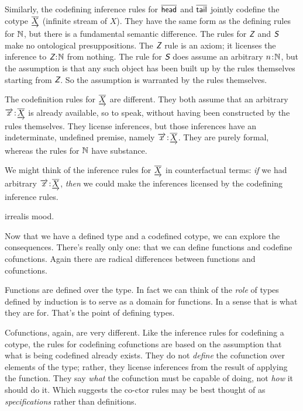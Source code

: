\documentclass{article}
\begin{document}
Similarly, the codefining inference rules for \(\overline{\textsf{head}}\) and
\(\overline{\textsf{tail}}\) jointly codefine the cotype \(\underrightarrow{\overline{X}}\) (infinite
stream of \(X\)). They have the same form as the defining rules for
\(\mathbb{N}\), but there is a fundamental semantic difference. The rules
for \(\Znat\) and \(\Snat\) make no ontological presuppositions. The
\(\Znat\) rule is an axiom; it licenses the inference to
\(\tj{\Znat}{\Nat}\) from nothing. The rule for \(\Snat\) does assume
an arbitrary \(n\hspace{1pt}\mathpunct{:}\hspace{-1pt}\mathbb{N}\), but the assumption is that any such
object has been built up by the rules themselves starting from
\(\Znat\). So the assumption is warranted by the rules themselves.

The codefinition rules for \(\underrightarrow{\overline{X}}\) are different. They both
assume that an arbitrary \(\overrightarrow{x}\hspace{1pt}\mathpunct{:}\hspace{-1pt}\underrightarrow{\overline{X}}\) is already
available, so to speak, without having been constructed by the rules
themselves. They license inferences, but those inferences have an
indeterminate, undefined premise, namely
\(\overrightarrow{x}\hspace{1pt}\mathpunct{:}\hspace{-1pt}\underrightarrow{\overline{X}}\). They are purely formal, whereas the
rules for \(\mathbb{N}\) have substance.

We might think of the inference rules for \(\underrightarrow{\overline{X}}\) in
counterfactual terms: \textit{if} we had arbitrary
\(\overrightarrow{x}\hspace{1pt}\mathpunct{:}\hspace{-1pt}\underrightarrow{\overline{X}}\), \textit{then} we could make the
inferences licensed by the codefining inference rules.

irrealis mood.

Now that we have a defined type and a codefined cotype, we can explore
the consequences. There's really only one: that we can define
functions and codefine cofunctions. Again there are radical differences between functions and cofunctions.

Functions are defined over the type. In fact we can think of the
\textit{role} of types defined by induction is to serve as a domain
for functions. In a sense that is what they are for. That's the point
of defining types.

Cofunctions, again, are very different. Like the inference rules for
codefining a cotype, the rules for codefining cofunctions are based on
the assumption that what is being codefined already exists. They do
not \textit{define} the cofunction over elements of the type; rather,
they license inferences from the result of applying the function. They
say \textit{what} the cofunction must be capable of doing, not
\textit{how} it should do it. Which suggests the co-ctor rules may be
best thought of as \textit{specifications} rather than definitions.
\end{document}
